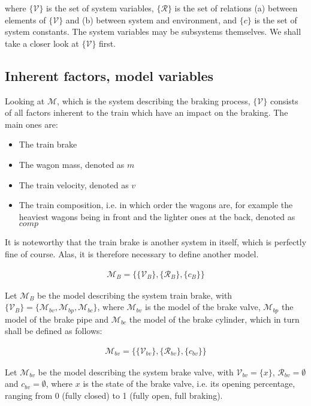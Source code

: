 \noindent
where $\{{\mathcal {V}}\}$ is the set of system variables, $\{{\mathcal {R}}\}$ is the set of relations (a) between elements of $\{{\mathcal {V}}\}$ and (b) between system and environment, and $\{c\}$ is the set of system constants. The system variables may be subsystems themselves. We shall take a closer look at $\{{\mathcal {V}}\}$ first.

\subsection{Inherent factors, model variables}
\label{sec:InherentFactors}
\par\noindent
Looking at ${\mathcal{M}}$, which is the system describing the braking process, $\{{\mathcal {V}}\}$ consists of all factors inherent to the train which have an impact on the braking. The main ones are:
\begin{itemize}
	\item The train brake
	\item The wagon mass, denoted as $m$
	\item The train velocity, denoted as $v$
	\item The train composition, i.e. in which order the wagons are, for example the heaviest wagons being in front and the lighter ones at the back, denoted as $comp$
\end{itemize}
\noindent
It is noteworthy that the train brake is another system in itself, which is perfectly fine of course. Alas, it is therefore necessary to define another model.

\begin{align*}
{\mathcal {M}}_{B} = \{ \{{\mathcal {V}}_{B}\}, \{{\mathcal{R}}_{B}\}, \{c_{B}\} \}
\end{align*}

\noindent
Let ${\mathcal{M}}_{B}$ be the model describing the system train brake, with $\{{\mathcal {V}}_{B}\} = \{ {\mathcal {M}}_{bv}, {\mathcal {M}}_{bp}, {\mathcal {M}}_{bc} \}$, where ${\mathcal {M}}_{bv}$ is the model of the brake valve, ${\mathcal {M}}_{bp}$ the model of the brake pipe and ${\mathcal {M}}_{bc}$ the model of the brake cylinder, which in turn shall be defined as follows:

\begin{align*}
{\mathcal {M}}_{bv} = \{ \{{\mathcal {V}}_{bv}\}, \{{\mathcal{R}}_{bv}\}, \{c_{bv}\} \}
\end{align*}

\noindent
Let ${\mathcal {M}}_{bv}$ be the model describing the system brake valve, with ${\mathcal {V}}_{bv} = \{x\}$, ${\mathcal {R}}_{bv} = \emptyset$ and $c_{bv} = \emptyset$, where $x$ is the state of the brake valve, i.e. its opening percentage, ranging from 0 (fully closed) to 1 (fully open, full braking).

